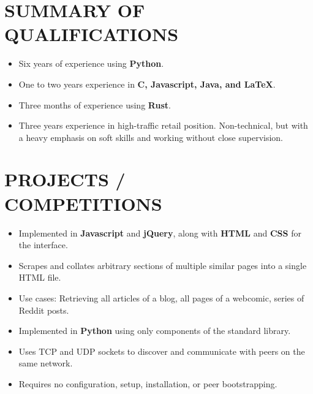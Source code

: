 \documentclass[11pt, margin, line]{res}
\begin{document}
\begin{resume}
 
\vspace{-1.5\topsep}
\section{SUMMARY OF \\ QUALIFICATIONS}   
    \begin{itemize}
        \item Six years of experience using \textbf{Python}.
        \item One to two years experience in \textbf{C, Javascript, Java, and LaTeX}.
        \item Three months of experience using \textbf{Rust}.
        \item Three years experience in high-traffic retail position. Non-technical, but with a heavy emphasis on soft skills and working without close supervision.
    \end{itemize}

\section{PROJECTS /\\ COMPETITIONS}
        \vspace{-\topsep}
        \begin{itemize}
            \item Implemented in \textbf{Javascript} and \textbf{jQuery}, along with \textbf{HTML} and \textbf{CSS} for the interface.
            \item Scrapes and collates arbitrary sections of multiple similar pages into a single HTML file.
            \item Use cases: Retrieving all articles of a blog, all pages of a webcomic, series of Reddit posts.
        \end{itemize}
    
        \vspace{-\topsep}
        \begin{itemize}
            \item Implemented in \textbf{Python} using only components of the standard library.
            \item Uses TCP and UDP sockets to discover and communicate with peers on the same network.
            \item Requires no configuration, setup, installation, or peer bootstrapping.
        \end{itemize}
    

\end{resume}
\end{document}
